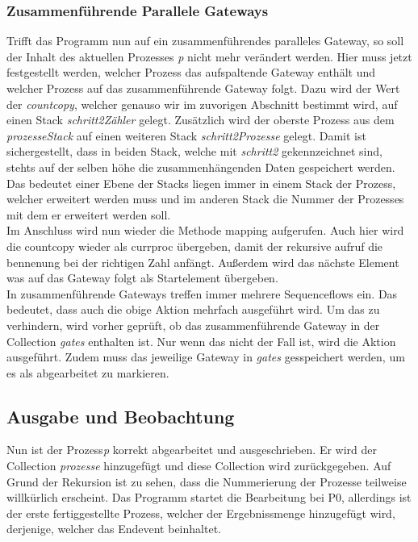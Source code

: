 \subsubsection{Zusammenführende Parallele Gateways}\label{Zusammenführende Parallele Gateways}
Trifft das Programm nun auf ein zusammenführendes paralleles Gateway, so soll der Inhalt des aktuellen Prozesses \textit{p} nicht mehr verändert werden. Hier muss jetzt festgestellt werden, welcher Prozess das aufspaltende Gateway enthält und welcher Prozess auf das zusammenführende Gateway folgt. Dazu wird der Wert der \textit{countcopy}, welcher genauso wir im zuvorigen Abschnitt bestimmt wird, auf einen Stack \textit{schritt2Zähler} gelegt. Zusätzlich wird der oberste Prozess aus dem \textit{prozesseStack} auf einen weiteren Stack \textit{schritt2Prozesse} gelegt. Damit ist sichergestellt, dass in beiden Stack, welche mit \textit{schritt2} gekennzeichnet sind, stehts auf der selben höhe die zusammenhängenden Daten gespeichert werden. Das bedeutet einer Ebene der Stacks liegen immer in einem Stack der Prozess, welcher erweitert werden muss und im anderen Stack die Nummer der Prozesses mit dem er erweitert werden soll.\\
Im Anschluss wird nun wieder die Methode mapping aufgerufen. Auch hier wird die countcopy wieder als currproc übergeben, damit der rekursive aufruf die bennenung bei der richtigen Zahl anfängt. Außerdem wird das nächste Element was auf das Gateway folgt als Startelement übergeben.\\
In zusammenführende Gateways treffen immer mehrere Sequenceflows ein. Das bedeutet, dass auch die obige Aktion mehrfach ausgeführt wird. Um das zu verhindern, wird vorher geprüft, ob das zusammenführende Gateway in der Collection \textit{gates} enthalten ist. Nur wenn das nicht der Fall ist, wird die Aktion ausgeführt. Zudem muss das jeweilige Gateway in \textit{gates} gesspeichert werden, um es als abgearbeitet zu markieren.
\subsection{Ausgabe und Beobachtung}\label{Ausgabe und Beobachtung}
Nun ist der Prozess\textit{p} korrekt abgearbeitet und ausgeschrieben. Er wird der Collection \textit{prozesse} hinzugefügt und diese Collection wird zurückgegeben. Auf Grund der Rekursion ist zu sehen, dass die Nummerierung der Prozesse teilweise willkürlich erscheint. Das Programm startet die Bearbeitung bei P0, allerdings ist der erste fertiggestellte Prozess, welcher der Ergebnissmenge hinzugefügt wird, derjenige, welcher das Endevent beinhaltet.












